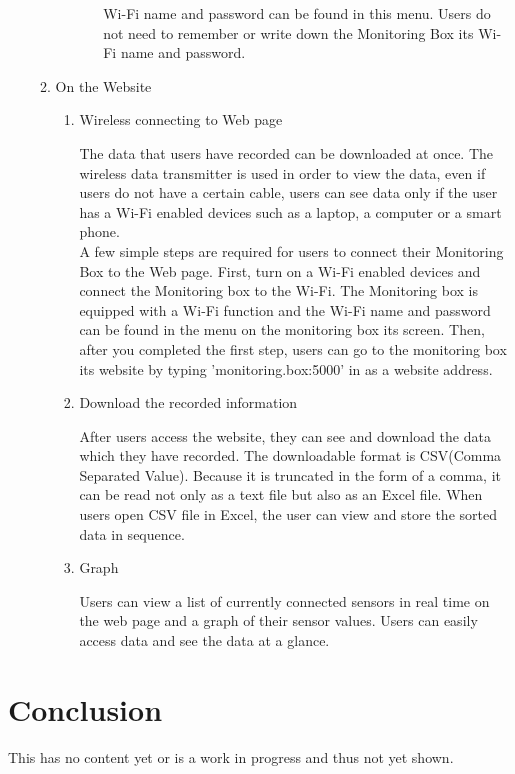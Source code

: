 \documentclass[conference]{IEEEtran}
\begin{document}
\begin{enumerate}
\begin{enumerate}
\begin{enumerate}
\begin{enumerate}
						Wi-Fi name and password can be found in this menu. Users do not need to remember or write down the Monitoring Box its Wi-Fi name and password.\\
				\end{enumerate}
			\end{enumerate}
		\item On the Website
			\begin{enumerate}
				\item Wireless connecting to Web page

					The data that users have recorded can be downloaded at once. The wireless data transmitter is used in order to view the data, even if users do not have a certain cable, users can see data only if the user has a Wi-Fi enabled devices such as a laptop, a computer or a smart phone. \\
					A few simple steps are required for users to connect their Monitoring Box to the Web page. First, turn on a Wi-Fi enabled devices and connect the Monitoring box to the Wi-Fi. The Monitoring box is equipped with a Wi-Fi function and the Wi-Fi name and password can be found in the menu on the monitoring box its screen. Then, after you completed the first step, users can go to the monitoring box its website by typing 'monitoring.box:5000' in as a website address.\\

				\item Download the recorded information

					After users access the website, they can see and download the data which they have recorded. The downloadable format is CSV(Comma Separated Value). Because it is truncated in the form of a comma, it can be read not only as a text file but also as an Excel file. When users open CSV file in Excel, the user can view and store the sorted data in sequence.\\

				\item Graph

					Users can view a list of currently connected sensors in real time on the web page and a graph of their sensor values. Users can easily access data and see the data at a glance.\\
			\end{enumerate}
		\end{enumerate}
 	\end{enumerate}
\section{Conclusion}
	This has no content yet or is a work in progress and thus not yet shown.
\end{document}
